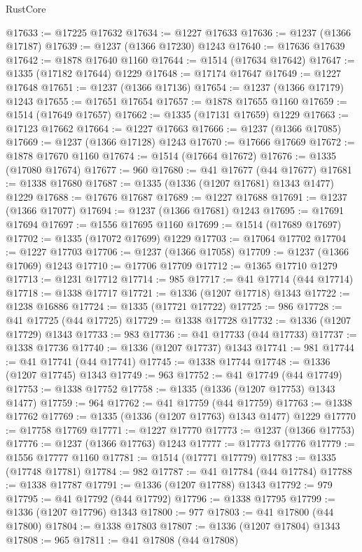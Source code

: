 \begin{lexlean}{RustCore}
\begin{coremodule}
@17633 := @17225 @17632
@17634 := @1227 @17633
@17636 := @1237 (@1366 @17187)
@17639 := @1237 (@1366 @17230) @1243
@17640 := @17636 @17639
@17642 := @1878 @17640 @1160
@17644 := @1514 (@17634 @17642)
@17647 := @1335 (@17182 @17644) @1229
@17648 := @17174 @17647
@17649 := @1227 @17648
@17651 := @1237 (@1366 @17136)
@17654 := @1237 (@1366 @17179) @1243
@17655 := @17651 @17654
@17657 := @1878 @17655 @1160
@17659 := @1514 (@17649 @17657)
@17662 := @1335 (@17131 @17659) @1229
@17663 := @17123 @17662
@17664 := @1227 @17663
@17666 := @1237 (@1366 @17085)
@17669 := @1237 (@1366 @17128) @1243
@17670 := @17666 @17669
@17672 := @1878 @17670 @1160
@17674 := @1514 (@17664 @17672)
@17676 := @1335 (@17080 @17674)
@17677 := 960
@17680 := @41 @17677 (@44 @17677)
@17681 := @1338 @17680
@17687 := @1335 (@1336 (@1207 @17681) @1343 @1477) @1229
@17688 := @17676 @17687
@17689 := @1227 @17688
@17691 := @1237 (@1366 @17077)
@17694 := @1237 (@1366 @17681) @1243
@17695 := @17691 @17694
@17697 := @1556 @17695 @1160
@17699 := @1514 (@17689 @17697)
@17702 := @1335 (@17072 @17699) @1229
@17703 := @17064 @17702
@17704 := @1227 @17703
@17706 := @1237 (@1366 @17058)
@17709 := @1237 (@1366 @17069) @1243
@17710 := @17706 @17709
@17712 := @1365 @17710 @1279
@17713 := @1231 @17712
@17714 := 985
@17717 := @41 @17714 (@44 @17714)
@17718 := @1338 @17717
@17721 := @1336 (@1207 @17718) @1343
@17722 := @1238 @16886
@17724 := @1335 (@17721 @17722)
@17725 := 986
@17728 := @41 @17725 (@44 @17725)
@17729 := @1338 @17728
@17732 := @1336 (@1207 @17729) @1343
@17733 := 983
@17736 := @41 @17733 (@44 @17733)
@17737 := @1338 @17736
@17740 := @1336 (@1207 @17737) @1343
@17741 := 981
@17744 := @41 @17741 (@44 @17741)
@17745 := @1338 @17744
@17748 := @1336 (@1207 @17745) @1343
@17749 := 963
@17752 := @41 @17749 (@44 @17749)
@17753 := @1338 @17752
@17758 := @1335 (@1336 (@1207 @17753) @1343 @1477)
@17759 := 964
@17762 := @41 @17759 (@44 @17759)
@17763 := @1338 @17762
@17769 := @1335 (@1336 (@1207 @17763) @1343 @1477) @1229
@17770 := @17758 @17769
@17771 := @1227 @17770
@17773 := @1237 (@1366 @17753)
@17776 := @1237 (@1366 @17763) @1243
@17777 := @17773 @17776
@17779 := @1556 @17777 @1160
@17781 := @1514 (@17771 @17779)
@17783 := @1335 (@17748 @17781)
@17784 := 982
@17787 := @41 @17784 (@44 @17784)
@17788 := @1338 @17787
@17791 := @1336 (@1207 @17788) @1343
@17792 := 979
@17795 := @41 @17792 (@44 @17792)
@17796 := @1338 @17795
@17799 := @1336 (@1207 @17796) @1343
@17800 := 977
@17803 := @41 @17800 (@44 @17800)
@17804 := @1338 @17803
@17807 := @1336 (@1207 @17804) @1343
@17808 := 965
@17811 := @41 @17808 (@44 @17808)

\end{coremodule}
\end{lexlean}

